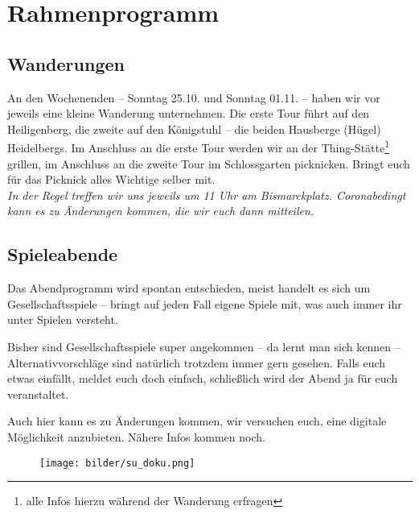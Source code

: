 \section{Rahmenprogramm}
\subsection{Wanderungen}
An den Wochenenden -- Sonntag 25.10. und Sonntag 01.11. -- haben wir vor jeweils eine kleine Wanderung unternehmen. Die erste Tour führt auf den Heiligenberg, die zweite auf den Königstuhl -- die beiden Hausberge (Hügel) Heidelbergs. Im Anschluss an die erste Tour werden wir an der Thing-Stätte\footnote{alle Infos hierzu während der Wanderung erfragen} grillen, im Anschluss an die zweite Tour im Schlossgarten picknicken. Bringt euch für das Picknick alles Wichtige selber mit.\\

\noindent\emph{In der Regel treffen wir uns jeweils um 11 Uhr am Bismarckplatz. Coronabedingt kann es zu Änderungen kommen, die wir euch dann mitteilen.}

\vfill


\eject

\subsection{Spieleabende}
Das Abendprogramm wird spontan entschieden, meist handelt es sich um Gesellschaftsspiele -- bringt auf jeden Fall eigene Spiele mit, was auch immer ihr unter Spielen versteht.

Bisher sind Gesellschaftsspiele super angekommen -- da lernt man sich kennen -- Alternativvorschläge sind natürlich trotzdem immer gern gesehen. Falls euch etwas einfällt, meldet euch doch einfach, schließlich wird der Abend ja für euch veranstaltet.

Auch hier kann es zu Änderungen kommen, wir versuchen euch, eine digitale Möglichkeit anzubieten. Nähere Infos kommen noch.



\vspace{4cm}

\begin{figure}[h]
\centering
\texttt{[image: bilder/su\_doku.png]}
\end{figure}
